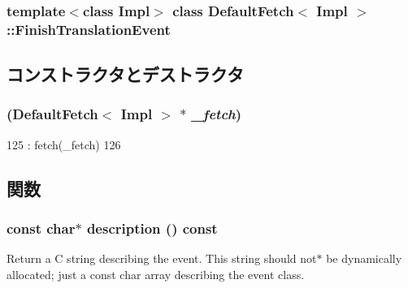 \subsubsection*{template$<$class Impl$>$ class DefaultFetch$<$ Impl $>$::FinishTranslationEvent}



\subsection{コンストラクタとデストラクタ}
\hypertarget{classDefaultFetch_1_1FinishTranslationEvent_ac469405b6804676934aeb537f7c19dc5}{
\subsubsection[{FinishTranslationEvent}]{ ({\bf DefaultFetch}$<$ Impl $>$ $\ast$ {\em \_\-fetch})}}
\label{classDefaultFetch_1_1FinishTranslationEvent_ac469405b6804676934aeb537f7c19dc5}



\begin{DoxyCode}
125             : fetch(_fetch)
126         {}
\end{DoxyCode}


\subsection{関数}
\hypertarget{classDefaultFetch_1_1FinishTranslationEvent_a2bd90422eece9190794479e08092a252}{
\subsubsection[{description}]{\setlength{\rightskip}{0pt plus 5cm}const char$\ast$ description () const}}
\label{classDefaultFetch_1_1FinishTranslationEvent_a2bd90422eece9190794479e08092a252}
Return a C string describing the event. This string should not$\ast$ be dynamically allocated; just a const char array describing the event class. 

